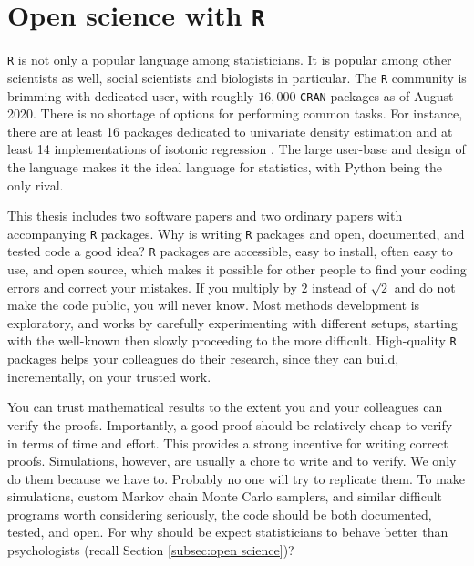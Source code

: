 \section{Open science with \texttt{R}}

\texttt{R} is not only a popular language among statisticians. It is popular among other scientists as well, social scientists and biologists in particular. The \texttt{R} community is brimming with dedicated user, with roughly $16,000$ \texttt{CRAN} packages as of August 2020. There is no shortage of options for performing common tasks. For instance, there are at least 16 packages dedicated to univariate density estimation \parencite{Deng2011-bk} and at least 14 implementations of isotonic regression \parencite{Busing2019-tv}. The large user-base and design of the language makes it the ideal language for statistics, with Python \parencite{Van_Rossum1995-lj} being the only rival. 

This thesis includes two software papers and two ordinary papers with accompanying \texttt{R} packages. Why is writing \texttt{R} packages and open, documented, and tested code a good idea? \texttt{R} packages are accessible, easy to install, often easy to use, and open source, which makes it possible for other people to find your coding errors and correct your mistakes. If you multiply by $2$ instead of $\sqrt{2}$ and do not make the code public, you will never know. Most methods development is exploratory, and works by carefully experimenting with different setups, starting with the well-known then slowly proceeding to the more difficult. High-quality \texttt{R} packages helps your colleagues do their research, since they can build, incrementally, on your trusted work.  

You can trust mathematical results to the extent you and your colleagues can verify the proofs. Importantly, a good proof should be relatively cheap to verify in terms of time and effort. This provides a strong incentive for writing correct proofs. Simulations, however, are usually a chore to write and to verify. We only do them because we have to. Probably no one will try to replicate them. To make simulations, custom Markov chain Monte Carlo samplers, and similar difficult programs worth considering seriously, the code should be both documented, tested, and open. For why should be expect statisticians to behave better than psychologists (recall Section \ref{subsec:open science})?

